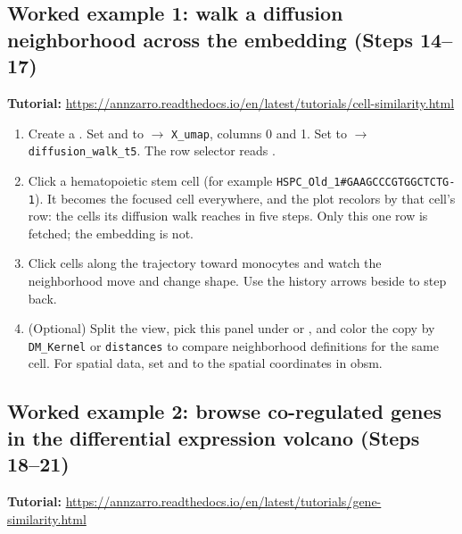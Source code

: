 \subsection{Worked example 1: walk a diffusion neighborhood across the embedding (Steps 14--17)}

\noindent\textbf{Tutorial:} \url{https://annzarro.readthedocs.io/en/latest/tutorials/cell-similarity.html}


\begin{enumerate}[start=14]
\item Create a . Set  and  to  $\rightarrow$ \texttt{X\_umap}, columns 0 and 1. Set  to  $\rightarrow$ \texttt{diffusion\_walk\_t5}. The row selector reads .

\item Click a hematopoietic stem cell (for example \texttt{HSPC\_Old\_1\#GAAGCCCGTGGCTCTG-1}). It becomes the focused cell everywhere, and the plot recolors by that cell's row: the cells its diffusion walk reaches in five steps. Only this one row is fetched; the embedding is not.

\item Click cells along the trajectory toward monocytes and watch the neighborhood move and change shape. Use the history arrows beside  to step back.

\item (Optional) Split the view, pick this panel under  or , and color the copy by \texttt{DM\_Kernel} or \texttt{distances} to compare neighborhood definitions for the same cell. For spatial data, set  and  to the spatial coordinates in obsm.
\end{enumerate}

\subsection{Worked example 2: browse co-regulated genes in the differential expression volcano (Steps 18--21)}

\noindent\textbf{Tutorial:} \url{https://annzarro.readthedocs.io/en/latest/tutorials/gene-similarity.html}


